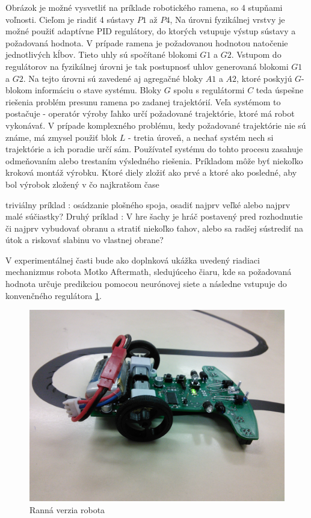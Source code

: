 Obrázok je možné vysvetliť na príklade robotického ramena, so 4 stupňami voľnosti.
Cieľom je riadiť 4 sústavy $P1$ až $P4$, Na úrovni fyzikálnej vrstvy je možné použiť
adaptívne PID regulátory, do ktorých vstupuje výstup sústavy a požadovaná hodnota.
V prípade ramena je požadovanou hodnotou natočenie jednotlivých kĺbov. Tieto uhly sú
spočítané blokomi $G1$ a $G2$. Vstupom do regulátorov na fyzikálnej úrovni je tak
postupnosť uhlov generovaná blokomi $G1$ a $G2$. Na tejto úrovni sú zavedené aj
agregačné bloky $A1$ a $A2$, ktoré poskyjú $G$-blokom informáciu o stave systému.
Bloky $G$ spolu s regulátormi $C$ teda úspešne riešenia problém presunu ramena
po zadanej trajektórií.
Veľa systémom to postačuje - operatór výroby ľahko určí požadované trajektórie,
ktoré má robot vykonávať. V prípade komplexného problému, kedy požadované trajektórie
nie sú známe, má zmysel použiť blok $L$ - tretia úroveň, a nechať systém nech si trajektórie
a ich poradie určí sám. Používateľ systému do tohto procesu zasahuje odmeňovaním
alebo trestaním výsledného riešenia. Príkladom môže byť niekoľko kroková montáž výrobku.
Ktoré diely zložiť ako prvé a ktoré ako posledné, aby bol výrobok zložený v čo najkratšom čase

triviálny príklad : osádzanie plošného spoja, osadiť najprv veľké alebo najprv malé súčiastky?
Druhý príklad : V hre šachy je hráč postavený pred rozhodnutie či najprv vybudovať obranu a stratiť niekoľko ťahov,
alebo sa radšej sústrediť na útok a riskovať slabinu vo vlastnej obrane?

V experimentálnej časti bude ako doplnková ukážka uvedený riadiaci mechanizmus robota
Motko Aftermath, sledujúceho čiaru, kde sa požadovaná hodnota určuje predikciou pomocou neurónovej siete a
následne vstupuje do konvenčného regulátora \ref{img:motoko_reloaded}.

\begin{figure}[!htb]
\center
\includegraphics[scale=.1]{../pictures/motoko.jpg}
\caption{Ranná verzia robota}
\label{img:motoko_reloaded}
\end{figure}


